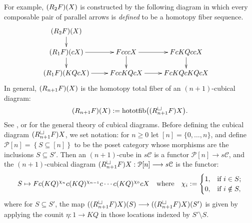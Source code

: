 \documentclass[11pt]{amsart}
\theoremstyle{plain}
\theoremstyle{definition}
\renewcommand{\to}{\longrightarrow}
\newcommand{\calP}{\mathcal{P}}
\newcommand{\calC}{\mathcal{C}}
\theoremstyle{plain}
\newcommand{\algcat}{{\calC}}%
\newcommand{\dupdown}[2]{R_{\smash{#1}}}
\newcommand{\plainD}{R}
\begin{document}
\begin{BK spec seq}
For example, $(\dupdown{2}{c}F)(X)$ is constructed by the following diagram in which every composable pair of parallel arrows is \emph{defined} to be a homotopy fiber sequence.
\[\def\labelstyle{\scriptstyle}
\xymatrix@!0@R=30pt@C=43pt{
(\dupdown{2}{c}F)(X)\ar[d]\\
(\dupdown{1}{c}F)(cX) \ar[rr]\ar[d]         &           &FcccX \ar[rr]\ar[d]         &           &   FcKQccX            \ar[d]  &                  \\
(\dupdown{1}{c}F)(KQcX) \ar[rr] &                     &  FccKQcX \ar[rr] &             & FcKQcKQcX
}\]
In general, $(\dupdown{n+1}{c}F)(X)$ is the homotopy total fiber of an $(n+1)$-cubical diagram:
\[(\dupdown{n+1}{c}F)(X):=\textup{hototfib} \bigl(({\plainD}_{n+1}^{\smash{\square}}F)X\bigr).\]
See \cite{GoodwillieCalcII}, \cite{LuisGoodwillie.pdf} or \cite{CubicalHomotopyTheory.pdf} for the general theory of cubical diagrams. Before defining the cubical diagram $({\plainD}_{n+1}^{\smash{\square}}F)X$, we set notation: for $n\geq0$ let $[n]=\{0,\ldots,n\}$, and define $\calP[n]=\left\{S\subseteq [n]\right\}$ to be the poset category whose morphisms are the inclusions $S\subseteq S'$. Then an $(n+1)$-cube in $s\algcat$ is a functor $\calP[n]\to s\algcat$, and the $(n+1)$-cubical diagram $({\plainD}_{n+1}^{\smash{\square}}F)X:\calP[n]\to s\algcat$ is the functor:
\[S\mapsto Fc(KQ)^{\chi_{n}}c(KQ)^{\chi_{n-1}}c\cdots c(KQ)^{\chi_0}cX\quad \textup{where}\quad \chi_i:=\begin{cases}
1,&\textup{if }i\in S;\\
0,&\textup{if }i\notin S,
\end{cases}
\]
where for $S\subseteq S'$, the map $(({\plainD}_{n+1}^{\smash{\square}}F)X)(S)\to (({\plainD}_{n+1}^{\smash{\square}}F)X)(S')$ is given by applying the counit $\eta:1\to KQ$ in those locations indexed by $S'\setminus S$.



\end{BK spec seq}
\end{document}
